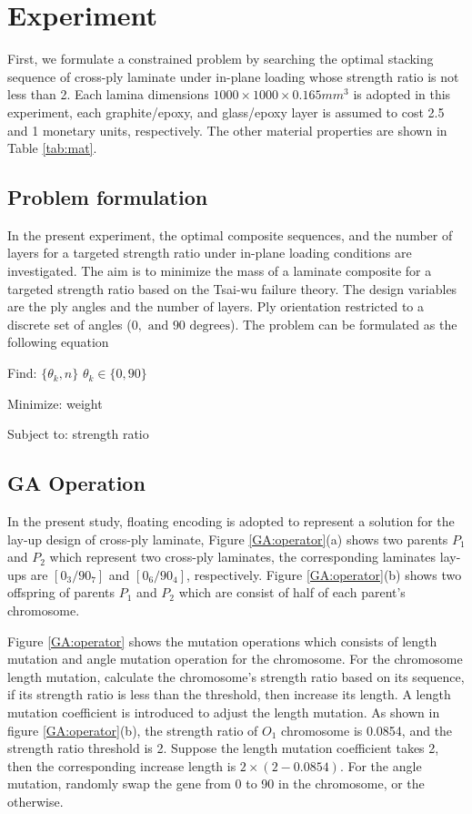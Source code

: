 \section{Experiment}
First, we formulate a constrained problem by searching the optimal stacking
sequence of cross-ply laminate under in-plane loading whose strength ratio is
not less than 2.  Each lamina dimensions $1000 \times 1000 \times 0.165 mm^3$
is adopted in this experiment, each graphite/epoxy,  and glass/epoxy layer is
assumed to cost 2.5 and 1 monetary units, respectively. The other material
properties are shown in Table \ref{tab:mat}. 


\subsection{Problem formulation}

In the present experiment, the optimal composite sequences, and the number of
layers for a targeted strength ratio under in-plane loading conditions are
investigated.  The aim is to minimize the mass of a laminate composite for a
targeted strength ratio based on the Tsai-wu failure theory. The design
variables are the ply angles and the number of layers.  Ply orientation
restricted to a discrete set of angles ($0, \text{ and } 90 \text{ degrees} $).
The problem can be formulated as the following equation

Find: $\{\theta_k, n\}$ $\theta_k \in \{ 0,90\}$

Minimize: weight

Subject to: strength ratio


\subsection{GA Operation}


In the present study, floating encoding is adopted to represent a solution for
the lay-up design of cross-ply laminate, Figure \ref{GA:operator}(a) shows two
parents $P_1$ and $P_2$ which represent two cross-ply laminates, the
corresponding laminates lay-ups are $[0_3/90_7]$ and $[0_6/90_4]$,
respectively. Figure \ref{GA:operator}(b) shows two offspring of parents $P_1$
and $P_2$ which are consist of half of each parent's chromosome.

Figure \ref{GA:operator} shows the mutation operations which consists of
length mutation and angle mutation operation for the chromosome. For the chromosome length
mutation, calculate the chromosome's strength ratio based on its sequence, if
its strength ratio is less than the threshold, then increase its length. A length
mutation coefficient is introduced to adjust the length mutation.  As
shown in figure \ref{GA:operator}(b), the strength ratio of $O_1$ chromosome is
0.0854, and the strength ratio threshold is 2. Suppose the length mutation
coefficient takes 2, then the corresponding increase length is $2
\times(2-0.0854)$. For the angle mutation, randomly swap the gene from
0 to 90 in the chromosome, or the otherwise.



